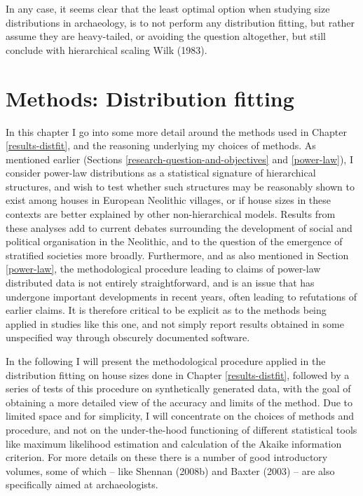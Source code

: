 \documentclass[
  12pt,
  a4paper, twoside]{book}
\begin{document}
In any case, it seems clear that the least optimal option when studying size distributions in archaeology, is to not perform any distribution fitting, but rather assume they are heavy-tailed, or avoiding the question altogether, but still conclude with hierarchical scaling Wilk (1983).

\hypertarget{methods-distfit}{%
\chapter{Methods: Distribution fitting}\label{methods-distfit}}

In this chapter I go into some more detail around the methods used in Chapter \ref{results-distfit}, and the reasoning underlying my choices of methods. As mentioned earlier (Sections \ref{research-question-and-objectives} and \ref{power-law}), I consider power-law distributions as a statistical signature of hierarchical structures, and wish to test whether such structures may be reasonably shown to exist among houses in European Neolithic villages, or if house sizes in these contexts are better explained by other non-hierarchical models. Results from these analyses add to current debates surrounding the development of social and political organisation in the Neolithic, and to the question of the emergence of stratified societies more broadly. Furthermore, and as also mentioned in Section \ref{power-law}, the methodological procedure leading to claims of power-law distributed data is not entirely straightforward, and is an issue that has undergone important developments in recent years, often leading to refutations of earlier claims. It is therefore critical to be explicit as to the methods being applied in studies like this one, and not simply report results obtained in some unspecified way through obscurely documented software.

In the following I will present the methodological procedure applied in the distribution fitting on house sizes done in Chapter \ref{results-distfit}, followed by a series of tests of this procedure on synthetically generated data, with the goal of obtaining a more detailed view of the accuracy and limits of the method. Due to limited space and for simplicity, I will concentrate on the choices of methods and procedure, and not on the under-the-hood functioning of different statistical tools like maximum likelihood estimation and calculation of the Akaike information criterion. For more details on these there is a number of good introductory volumes, some of which -- like Shennan (2008b) and Baxter (2003) -- are also specifically aimed at archaeologists.
\end{document}
